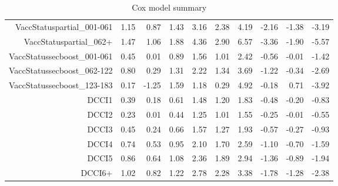 \begin{table}[ht]
\begin{tabular}{rrrrrrrrrr}
  VaccStatuspartial\_001-061 & 1.15 & 0.87 & 1.43 & 3.16 & 2.38 & 4.19 & -2.16 & -1.38 & -3.19 \\ 
  VaccStatuspartial\_062+ & 1.47 & 1.06 & 1.88 & 4.36 & 2.90 & 6.57 & -3.36 & -1.90 & -5.57 \\ 
  VaccStatussecboost\_001-061 & 0.45 & 0.01 & 0.89 & 1.56 & 1.01 & 2.42 & -0.56 & -0.01 & -1.42 \\ 
  VaccStatussecboost\_062-122 & 0.80 & 0.29 & 1.31 & 2.22 & 1.34 & 3.69 & -1.22 & -0.34 & -2.69 \\ 
  VaccStatussecboost\_123-183 & 0.17 & -1.25 & 1.59 & 1.18 & 0.29 & 4.92 & -0.18 & 0.71 & -3.92 \\ 
  DCCI1 & 0.39 & 0.18 & 0.61 & 1.48 & 1.20 & 1.83 & -0.48 & -0.20 & -0.83 \\ 
  DCCI2 & 0.23 & 0.01 & 0.44 & 1.25 & 1.01 & 1.55 & -0.25 & -0.01 & -0.55 \\ 
  DCCI3 & 0.45 & 0.24 & 0.66 & 1.57 & 1.27 & 1.93 & -0.57 & -0.27 & -0.93 \\ 
  DCCI4 & 0.74 & 0.53 & 0.95 & 2.10 & 1.70 & 2.59 & -1.10 & -0.70 & -1.59 \\ 
  DCCI5 & 0.86 & 0.64 & 1.08 & 2.36 & 1.89 & 2.94 & -1.36 & -0.89 & -1.94 \\ 
  DCCI6+ & 1.02 & 0.82 & 1.22 & 2.78 & 2.28 & 3.38 & -1.78 & -1.28 & -2.38 \\ 
   \hline
\end{tabular}
\caption{Cox model summary} 
\end{table}
